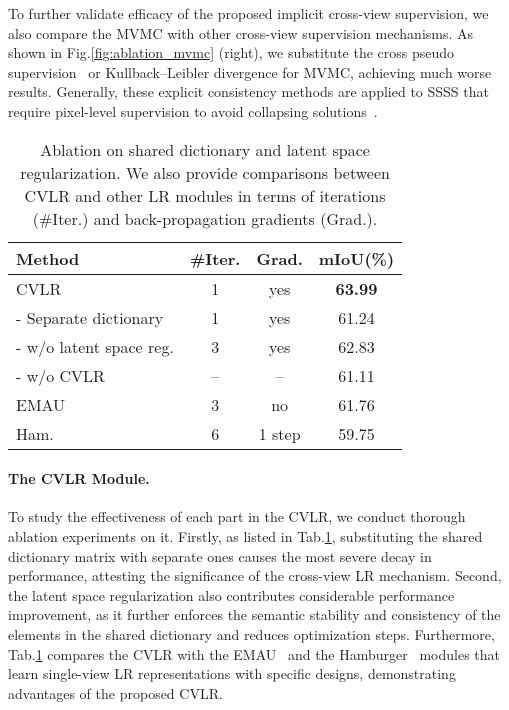 \documentclass[twocolumn]{svjour3}          \smartqed  \usepackage{graphicx}
\makeatletter
\newcommand{\Fig}{Fig.\@\xspace}
\newcommand{\Tab}{Tab.\@\xspace}
\newcommand{\prelim}[1]{{#1}}
\makeatother
\begin{document}
\prelim{
To further validate efficacy of the proposed implicit cross-view supervision, we also compare the MVMC with other cross-view supervision mechanisms.
As shown in \Fig\ref{fig:ablation_mvmc} (right), we substitute the cross pseudo supervision~\citep{Chen2021:CrossPseudo} or Kullback–Leibler divergence for MVMC, achieving much worse results.
Generally, these explicit consistency methods are applied to SSSS that require pixel-level supervision to avoid collapsing solutions~\citep{Xinlei:SimSiam}.
}


\begin{table}
\centering
        \begin{tabularx}{\linewidth}{ X | c c | c }
            \toprule
            Method & \#Iter. & Grad.  & mIoU(\%) \\
            \midrule
            CVLR & 1 & yes &   \textbf{63.99}\\
- Separate dictionary  & 1 & yes &   61.24\\
            - w/o latent space reg. & 3 & yes & 62.83\\
            - w/o CVLR & {--} & {--} &   61.11\\
            \midrule
            EMAU~\small\citep{Lixia19:EMANET} & 3 & no &   61.76\\
            Ham.~\small\citep{Zheng:ham} & 6 & 1 step &  59.75  \\
            \bottomrule
        \end{tabularx}
        \caption{
        \prelim{Ablation on shared dictionary  and latent space regularization. We also provide comparisons between CVLR and other LR modules in terms of iterations (\#Iter.) and back-propagation gradients (Grad.).}
        }
       \label{tab:ablation_cvlr_parts}
\end{table}


 \paragraph{The CVLR Module.}
\prelim{
To study the effectiveness of each part in the CVLR, we conduct thorough ablation experiments on it.
Firstly, as listed in \Tab\ref{tab:ablation_cvlr_parts}, substituting the shared dictionary matrix with separate ones causes the most severe decay in performance, attesting the significance of the cross-view LR mechanism.
Second, the latent space regularization also contributes considerable performance improvement, as it further enforces the semantic stability and consistency of the elements in the shared dictionary and reduces optimization steps.
Furthermore, \Tab\ref{tab:ablation_cvlr_parts} compares the CVLR with the EMAU~\citep{Lixia19:EMANET} and the Hamburger~\citep{Zheng:ham} modules that learn single-view LR representations with specific designs, demonstrating  advantages of the proposed CVLR.
}
\end{document}
